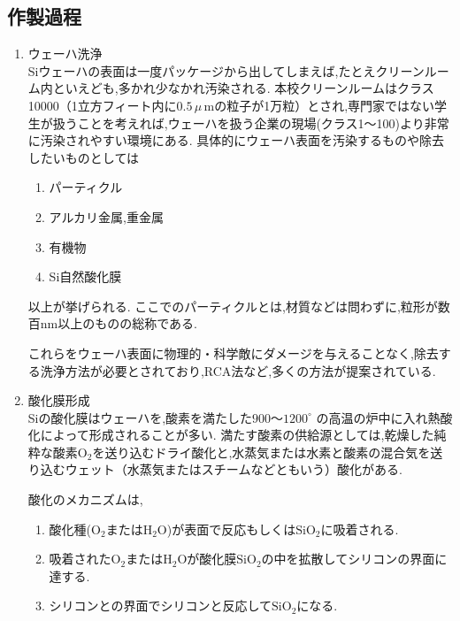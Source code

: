 \documentclass[11pt]{jarticle}
\begin{document}
	\subsection{作製過程}
		\begin{enumerate}
			\item ウェーハ洗浄\\
				Siウェーハの表面は一度パッケージから出してしまえば,たとえクリーンルーム内といえども,多かれ少なかれ汚染される.
				本校クリーンルームはクラス10000（1立方フィート内に$0.5\,\mu$\,mの粒子が1万粒）とされ,専門家ではない学生が扱うことを考えれば,ウェーハを扱う企業の現場(クラス1〜100)より非常に汚染されやすい環境にある.
				具体的にウェーハ表面を汚染するものや除去したいものとしては

				\begin{enumerate}
					\item パーティクル\\
					\item アルカリ金属,重金属\\
					\item 有機物\\
					\item Si自然酸化膜\\
				\end{enumerate}

				以上が挙げられる.
				ここでのパーティクルとは,材質などは問わずに,粒形が数百nm以上のものの総称である.

				これらをウェーハ表面に物理的・科学敵にダメージを与えることなく,除去する洗浄方法が必要とされており,RCA法など,多くの方法が提案されている.

			\item 酸化膜形成\\
				Siの酸化膜はウェーハを,酸素を満たした$900〜1200^\circ$ の高温の炉中に入れ熱酸化によって形成されることが多い.
				満たす酸素の供給源としては,乾燥した純粋な酸素$\mathrm{O_{2}}$を送り込むドライ酸化と,水蒸気または水素と酸素の混合気を送り込むウェット（水蒸気またはスチームなどともいう）酸化がある.

				酸化のメカニズムは,

				\begin{enumerate}
					\item 酸化種($\mathrm{O_{2}}$または$\mathrm{H_{2}O}$)が表面で反応もしくは$\mathrm{SiO_{2}}$に吸着される.\\
					\item 吸着された$\mathrm{O}_{2}$または$\mathrm{H_{2}O}$が酸化膜$\mathrm{SiO_{2}}$の中を拡散してシリコンの界面に達する.\\
					\item シリコンとの界面でシリコンと反応して$\mathrm{SiO_{2}}$になる.\\
				\end{enumerate}
				

\end{enumerate}
\end{document}
